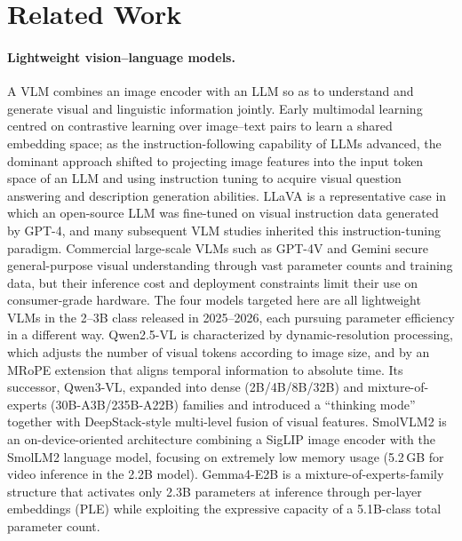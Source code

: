 \section{Related Work}
\label{sec:related}

\paragraph{Lightweight vision--language models.}
A VLM combines an image encoder with an LLM so as to understand and generate
visual and linguistic information jointly. Early multimodal learning centred on
contrastive learning over image--text pairs to learn a shared embedding space; as
the instruction-following capability of LLMs advanced, the dominant approach
shifted to projecting image features into the input token space of an LLM and
using instruction tuning to acquire visual question answering and description
generation abilities. LLaVA \citep{liu2023llava} is a representative case in
which an open-source LLM was fine-tuned on visual instruction data generated by
GPT-4, and many subsequent VLM studies inherited this instruction-tuning
paradigm. Commercial large-scale VLMs such as GPT-4V and Gemini secure
general-purpose visual understanding through vast parameter counts and training
data, but their inference cost and deployment constraints limit their use on
consumer-grade hardware. The four models targeted here are all lightweight VLMs
in the 2--3B class released in 2025--2026, each pursuing parameter efficiency in
a different way. Qwen2.5-VL \citep{bai2025qwen25vl} is characterized by
dynamic-resolution processing, which adjusts the number of visual tokens
according to image size, and by an MRoPE extension that aligns temporal
information to absolute time. Its successor, Qwen3-VL, expanded into dense
(2B/4B/8B/32B) and mixture-of-experts (30B-A3B/235B-A22B) families and introduced
a ``thinking mode'' together with DeepStack-style multi-level fusion of visual
features. SmolVLM2 \citep{marafioti2025smolvlm} is an on-device-oriented
architecture combining a SigLIP image encoder with the SmolLM2 language model,
focusing on extremely low memory usage (5.2\,GB for video inference in the 2.2B
model). Gemma4-E2B is a mixture-of-experts-family structure that activates only
2.3B parameters at inference through per-layer embeddings (PLE) while exploiting
the expressive capacity of a 5.1B-class total parameter count.

